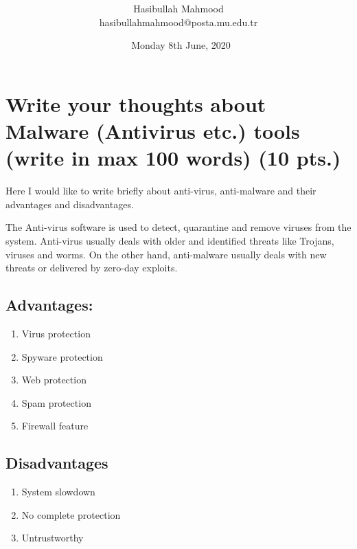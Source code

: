 \documentclass{article} %
\title{\spacecaps{Assignment 4 as Final}\\ \normalsize \spacesc{CENG3544, Computer and Network Security} }
\author{Hasibullah Mahmood\\hasibullahmahmood@posta.mu.edu.tr}
\date{\ Monday 8th June, 2020}
\begin{document}
\maketitle

\section{ Write your thoughts about Malware (Antivirus etc.) tools (write in max 100 words) (10 pts.)}

\noindent Here I would like to write briefly about anti-virus, anti-malware and their advantages and disadvantages.

\noindent The Anti-virus software is used to detect, quarantine and remove viruses from the system. Anti-virus usually deals with older and identified threats like Trojans, viruses and worms. On the other hand, anti-malware usually deals with new threats or delivered by zero-day exploits.


\subsection{Advantages:}

\begin{enumerate}
\item  Virus protection

\item  Spyware protection

\item  Web protection

\item  Spam protection

\item  Firewall feature
\end{enumerate}


\subsection{Disadvantages}

\begin{enumerate}
\item  System slowdown

\item  No complete protection

\item  Untrustworthy
\end{enumerate}
\end{document}
